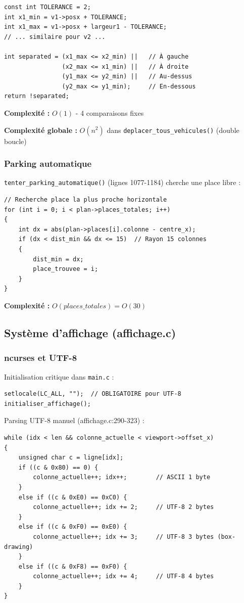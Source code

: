 \documentclass[12pt,a4paper]{article}
\begin{document}
\begin{lstlisting}
const int TOLERANCE = 2;
int x1_min = v1->posx + TOLERANCE;
int x1_max = v1->posx + largeur1 - TOLERANCE;
// ... similaire pour v2 ...

int separated = (x1_max <= x2_min) ||   // À gauche
                (x2_max <= x1_min) ||   // À droite
                (y1_max <= y2_min) ||   // Au-dessus
                (y2_max <= y1_min);     // En-dessous
return !separated;
\end{lstlisting}

\textbf{Complexité :} $O(1)$ - 4 comparaisons fixes

\textbf{Complexité globale :} $O(n^2)$ dans \texttt{deplacer\_tous\_vehicules()} (double boucle)

\subsubsection{Parking automatique}

\texttt{tenter\_parking\_automatique()} (lignes 1077-1184) cherche une place libre :

\begin{lstlisting}
// Recherche place la plus proche horizontale
for (int i = 0; i < plan->places_totales; i++)
{
    int dx = abs(plan->places[i].colonne - centre_x);
    if (dx < dist_min && dx <= 15)  // Rayon 15 colonnes
    {
        dist_min = dx;
        place_trouvee = i;
    }
}
\end{lstlisting}

\textbf{Complexité :} $O(places\_totales) = O(30)$

\subsection{Système d'affichage (affichage.c)}

\subsubsection{ncurses et UTF-8}

Initialisation critique dans \texttt{main.c} :

\begin{lstlisting}
setlocale(LC_ALL, "");  // OBLIGATOIRE pour UTF-8
initialiser_affichage();
\end{lstlisting}

Parsing UTF-8 manuel (affichage.c:290-323) :

\begin{lstlisting}
while (idx < len && colonne_actuelle < viewport->offset_x)
{
    unsigned char c = ligne[idx];
    if ((c & 0x80) == 0) {
        colonne_actuelle++; idx++;        // ASCII 1 byte
    }
    else if ((c & 0xE0) == 0xC0) {
        colonne_actuelle++; idx += 2;     // UTF-8 2 bytes
    }
    else if ((c & 0xF0) == 0xE0) {
        colonne_actuelle++; idx += 3;     // UTF-8 3 bytes (box-drawing)
    }
    else if ((c & 0xF8) == 0xF0) {
        colonne_actuelle++; idx += 4;     // UTF-8 4 bytes
    }
}
\end{lstlisting}
\end{document}
